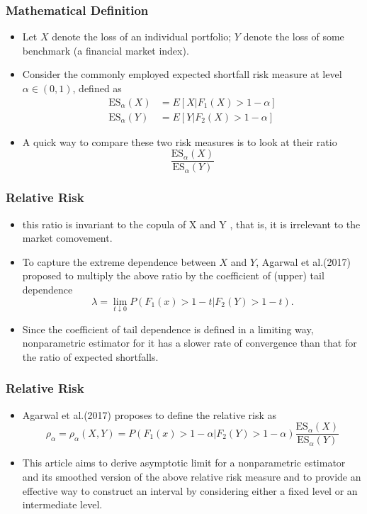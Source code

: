 \documentclass{beamer}
\newcommand{\suit}[1]{\left(#1\right)}
\begin{document}
\begin{frame}
    \frametitle{Mathematical Definition}
\begin{itemize}
    \item Let $X$ denote the loss of an individual portfolio; $Y$ denote the loss of some benchmark (a financial market index). 
    \item Consider the commonly employed expected shortfall
    risk measure at level $\alpha \in (0,1)$, defined as
    $$
    \begin{aligned}
        \text{ES}_{\alpha}(X)&=E[X|F_1(X)>1-\alpha] \\
        \text{ES}_{\alpha}(Y)&=E[Y|F_2(X)>1-\alpha]
    \end{aligned}
    $$
    \item A quick
    way to compare these two risk measures is to look at their ratio
    $$
            \frac{\text{ES}_{\alpha}(X)}{\text{ES}_{\alpha}(Y)}
    $$
\end{itemize}

\end{frame}

\begin{frame}
    \frametitle{Relative Risk}
\begin{itemize}
    \item this ratio  is invariant to the copula of X and Y , that is, it is irrelevant to the market comovement.
    \item To capture the extreme
    dependence between $X$ and $Y$, Agarwal et al.(2017) proposed to multiply the above ratio by the
    coefficient of (upper) tail dependence 
    $$
        \lambda = \lim_{t \downarrow 0} P\suit{F_1(x)>1-t|F_2(Y)>1-t}.
    $$
    \item Since the coefficient of tail dependence
    is defined in a limiting way, nonparametric estimator for it has
    a slower rate of convergence than that for the ratio of expected
    shortfalls.
\end{itemize}
    

\end{frame}

\begin{frame}
    \frametitle{Relative Risk}
    \begin{itemize}
        \item Agarwal et al.(2017)  proposes to define the relative risk as
        $$
\rho_{\alpha}=\rho_{\alpha}(X,Y)=P\suit{F_1(x)>1-\alpha|F_2(Y)>1-\alpha} \frac{\text{ES}_{\alpha}(X)}{\text{ES}_{\alpha}(Y)}
        $$
        \item This article aims to derive asymptotic
        limit for a nonparametric estimator and its smoothed version of
        the above relative risk measure and to provide an effective way
        to construct an interval by considering either a fixed level or an
        intermediate level.
    \end{itemize}
    
\end{frame}
\end{document}
